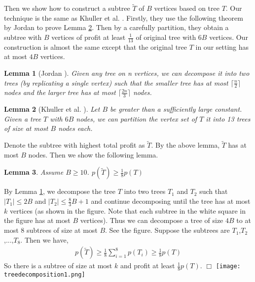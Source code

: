 \documentclass[11pt]{article}
\newcommand{\rednote}[1]{#1}
\newenvironment{proof}{\noindent {\em Proof: }\ignorespaces}{}
\newcommand{\qed}{\hspace*{\fill}$\Box$\medskip}
\newtheorem{lemma}{Lemma}
\begin{document}
Then we show how to construct a subtree $\tilde{T}$ of $B$ vertices based on tree $T$. Our technique is the same as Khuller et al. \cite{khuller2014analyzing}.
Firstly, they use the following theorem by Jordan \cite{jordan1869assemblages} to prove Lemma \ref{lm_khuller}. Then by a carefully partition, they obtain a subtree with $B$ vertices of profit at least $\frac{1}{13}$ of original tree with $6B$ vertices. Our construction is almost the same except that the original tree $T$ in our setting has at most $4B$ vertices.

\begin{lemma}[Jordan \cite{jordan1869assemblages}]
	Given any tree on n vertices, we can decompose it into two trees (by replicating a single vertex) such that the smaller tree has at most $\lceil \frac{n}{2} \rceil$ nodes and the larger tree has at most $\lceil \frac{2n}{3} \rceil$ nodes.
	\label{lm_jordan}
\end{lemma}
\begin{lemma}[Khuller et al. \cite{khuller2014analyzing}]
	Let $B$ be greater than a sufficiently large constant. Given a tree $T$ with $6B$ nodes, we can \rednote{partition the vertex set of $T$} it into 13 trees of size at most $B$ nodes each.
	\label{lm_khuller}
\end{lemma}

Denote the subtree with highest total profit as $\tilde{T}$. 
By the above lemma, $\tilde{T}$ has at most $B$ nodes.
Then we show the following lemma.
\begin{lemma}
	Assume $B\geq 10$. $p(\tilde{T}) \geq \frac{1}{8} p(T)$
	\label{th_treeDecompose}
\end{lemma}
\begin{proof} By Lemma \ref{lm_jordan}, we decompose the tree $T$ into two trees $T_1$ and $T_2$ such that $|T_1| \leq 2B $ and $|T_2| \leq \frac{8}{3}B+1$ and continue decomposing until the tree has at most $k$ vertices (as shown in the figure. Note that each subtree in the white square in the figure has at most $B$ vertices).
	Thus we can decompose a tree of size $4B$ to at most 8 subtrees of size at most $B$.
	See the figure.
	Suppose the subtrees are $T_1$,$T_2$,...,$T_8$. Then we have,
	\begin{align*}
	p(\tilde{T}) \geq \frac{1}{8} \sum_{i=1}^{8} p(T_i) \geq \frac{1}{8} p(T)
	\end{align*}
	So there is a subtree of size at most $k$ and profit at least $\frac{1}{8}p(T)$.
	\qed
\end{proof}
\texttt{[image: treedecomposition1.png]}
\end{document}
